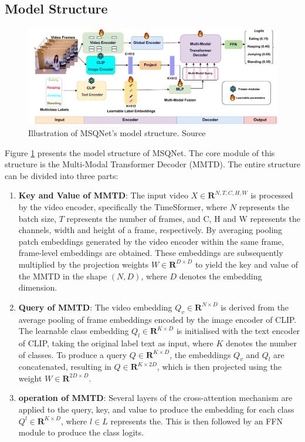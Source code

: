 \subsection{Model Structure}
\begin{figure}[ht]
    \centering
    \includegraphics[width=1.0\textwidth]{assets/charts_rw/MSQNet}
    \caption[Model Structure of MSQNet]{Illustration of MSQNet's model structure. Source \parencite{mondal2023msqnet}}
    \label{fig:discussion_msqnet}
\end{figure}

Figure \ref{fig:discussion_msqnet} presents the model structure of MSQNet. The core module of this structure is the Multi-Modal Transformer Decoder (MMTD). The entire structure can be divided into three parts: 

\begin{enumerate}
    \item \textbf{Key and Value of MMTD}: The input video $X \in \mathbf{R}^{N, T, C, H, W}$ is processed by the video encoder, specifically the TimeSformer, where $N$ represents the batch size, $T$ represents the number of frames, and C, H and W represents the channels, width and height of a frame, respectively. By averaging pooling patch embeddings generated by the video encoder within the same frame, frame-level embeddings are obtained. These embeddings are subsequently multiplied by the projection weights $W \in \mathbf{R}^{D \times D}$ to yield the key and value of the MMTD in the shape $(N, D)$, where $D$ denotes the embedding dimension. 
    \item \textbf{Query of MMTD}: The video embedding $Q_v \in \mathbf{R}^{N \times D}$ is derived from the average pooling of frame embeddings encoded by the image encoder of CLIP. The learnable class embedding $Q_l \in \mathbf{R}^{K \times D}$ is initialised with the text encoder of CLIP, taking the original label text as input, where $K$ denotes the number of classes. To produce a query $Q \in \mathbf{R}^{K \times D}$, the embeddings $Q_v$ and $Q_l$ are concatenated, resulting in $Q \in \mathbf{R}^{K \times 2D}$, which is then projected using the weight $W \in \mathbf{R}^{2D \times D}$. 
    \item \textbf{operation of MMTD}: Several layers of the cross-attention mechanism are applied to the query, key, and value to produce the embedding for each class $Q^l \in \mathbf{R}^{K \times D}$, where $l \in L$ represents the. This is then followed by an FFN module to produce the class logits.
\end{enumerate}

